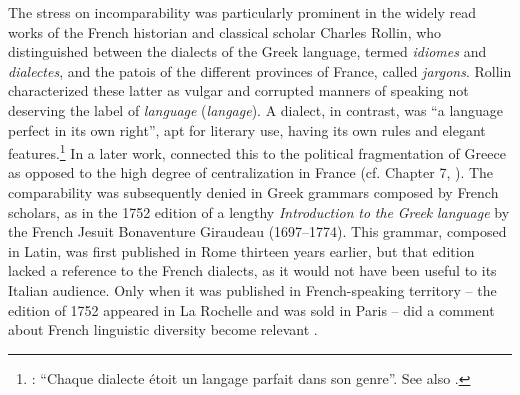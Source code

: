 The stress on incomparability was particularly prominent in the widely read works of the French historian and classical scholar Charles Rollin, who distinguished between the dialects of the Greek language, termed \textit{idiomes} and \textit{dialectes}, and the patois of the different provinces of France, called \textit{jargons}. Rollin characterized these latter as vulgar and corrupted manners of speaking not deserving the label of \textit{language} (\textit{langage}). A dialect, in contrast, was “a language perfect in its own right”, apt for literary use, having its own rules and elegant features.\footnote{\citet[117]{Rollin1726}: “Chaque dialecte étoit un langage parfait dans son genre”. See also \citet[395]{Rollin1731}.} In a later work, \citet[395]{Rollin1731} connected this to the political fragmentation of Greece as opposed to the high degree of centralization in France (cf. Chapter 7, ). The comparability was subsequently denied in Greek grammars composed by French scholars, as in the 1752 edition of a lengthy \textit{Introduction} \textit{to} \textit{the} \textit{Greek} \textit{language} by the French Jesuit Bonaventure Giraudeau (1697–1774). This grammar, composed in Latin, was first published in Rome thirteen years earlier, but that edition lacked a reference to the French dialects, as it would not have been useful to its Italian audience. Only when it was published in French-speaking territory – the edition of 1752 appeared in La Rochelle and was sold in Paris – did a comment about French linguistic diversity become relevant \citep[117]{Giraudeau1752}.

